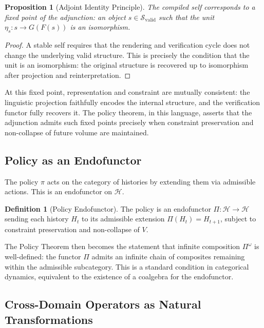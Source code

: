 \documentclass[12pt, a4paper]{article}
\theoremstyle{plain}
\newtheorem{proposition}[theorem]{Proposition}
\theoremstyle{definition}
\newtheorem{definition}[theorem]{Definition}
\theoremstyle{remark}
\begin{document}
\begin{proposition}[Adjoint Identity Principle]
The compiled self corresponds to a fixed point of the adjunction: an object $s \in \mathcal{S}_{\mathrm{valid}}$ such that the unit $\eta_s : s \to G(F(s))$ is an isomorphism.
\end{proposition}

\begin{proof}
A stable self requires that the rendering and verification cycle does not change the underlying valid structure. This is precisely the condition that the unit is an isomorphism: the original structure is recovered up to isomorphism after projection and reinterpretation.
\end{proof}

At this fixed point, representation and constraint are mutually consistent: the linguistic projection faithfully encodes the internal structure, and the verification functor fully recovers it. The policy theorem, in this language, asserts that the adjunction admits such fixed points precisely when constraint preservation and non-collapse of future volume are maintained.

\subsection{Policy as an Endofunctor}

The policy $\pi$ acts on the category of histories by extending them via admissible actions. This is an endofunctor on $\mathcal{H}$.

\begin{definition}[Policy Endofunctor]
The policy is an endofunctor $\Pi : \mathcal{H} \to \mathcal{H}$ sending each history $H_t$ to its admissible extension $\Pi(H_t) = H_{t+1}$, subject to constraint preservation and non-collapse of $V$.
\end{definition}

The Policy Theorem then becomes the statement that infinite composition $\Pi^\omega$ is well-defined: the functor $\Pi$ admits an infinite chain of composites remaining within the admissible subcategory. This is a standard condition in categorical dynamics, equivalent to the existence of a coalgebra for the endofunctor.

\subsection{Cross-Domain Operators as Natural Transformations}
\end{document}
